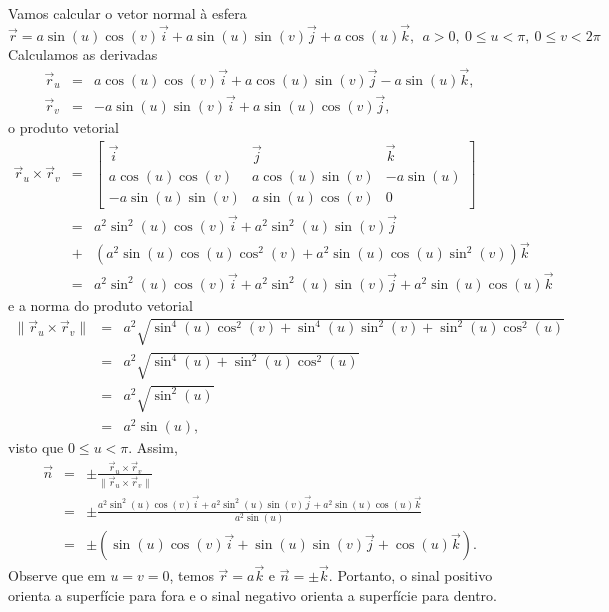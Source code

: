 \begin{ex}Vamos calcular o vetor normal à esfera
$$
\vec{r}=a\sin(u)\cos(v)\vec{i}+a\sin(u)\sin(v)\vec{j}+a\cos(u)\vec{k},~~ a>0, ~ 0\leq u< \pi, ~ 0\leq v< 2\pi
$$
Calculamos as derivadas
\begin{eqnarray*}
\vec{r}_u&=&a\cos(u)\cos(v)\vec{i}+a\cos(u)\sin(v)\vec{j}-a\sin(u)\vec{k},\\
\vec{r}_v&=&-a\sin(u)\sin(v)\vec{i}+a\sin(u)\cos(v)\vec{j},
\end{eqnarray*}
o produto vetorial
\begin{eqnarray*}
\vec{r}_u\times \vec{r}_v&=&\left[\begin{array}{ccc}
                                \vec{i}&\vec{j}&\vec{k}\\
                                a\cos(u)\cos(v)&a\cos(u)\sin(v)&-a\sin(u)\\
                                -a\sin(u)\sin(v)&a\sin(u)\cos(v)&0
                                \end{array}
\right]\\
&=&a^2\sin^2(u)\cos(v)\vec{i}+a^2\sin^2(u)\sin(v)\vec{j}\\&+&(a^2\sin(u)\cos(u)\cos^2(v)+a^2\sin(u)\cos(u)\sin^2(v))\vec{k}\\
&=&a^2\sin^2(u)\cos(v)\vec{i}+a^2\sin^2(u)\sin(v)\vec{j}+a^2\sin(u)\cos(u)\vec{k}
\end{eqnarray*}
e a norma do produto vetorial
\begin{eqnarray*}
\|\vec{r}_u\times \vec{r}_v\|&=&a^2\sqrt{\sin^4(u)\cos^2(v)+\sin^4(u)\sin^2(v)+\sin^2(u)\cos^2(u)}\\
&=&a^2\sqrt{\sin^4(u)+\sin^2(u)\cos^2(u)}\\
&=&a^2\sqrt{\sin^2(u)}\\
&=&a^2\sin(u),
\end{eqnarray*}
visto que $0\leq u< \pi$. Assim,
\begin{eqnarray*}
\vec{n}&=&\pm \frac{\vec{r}_u\times \vec{r}_v}{\|\vec{r}_u\times \vec{r}_v\|}\\
&=&\pm\frac{a^2\sin^2(u)\cos(v)\vec{i}+a^2\sin^2(u)\sin(v)\vec{j}+a^2\sin(u)\cos(u)\vec{k}}{a^2\sin(u)}\\
&=&\pm\left(\sin(u)\cos(v)\vec{i}+\sin(u)\sin(v)\vec{j}+\cos(u)\vec{k}\right).
\end{eqnarray*}
Observe que em $u=v=0$, temos $\vec{r}=a\vec{k}$ e $\vec{n}=\pm\vec{k}$. Portanto, o sinal positivo orienta a superfície para fora e o sinal negativo orienta a superfície para dentro.
\end{ex}


